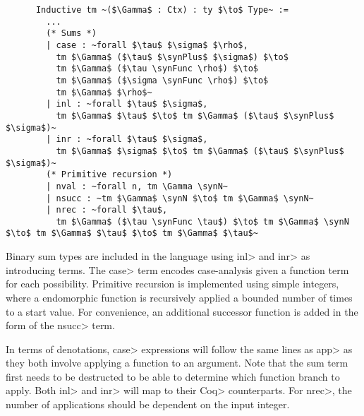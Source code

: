  \begin{listing}
    \begin{verbatim}
      Inductive tm ~($\Gamma$ : Ctx) : ty $\to$ Type~ :=
        ...
        (* Sums *)
        | case : ~forall $\tau$ $\sigma$ $\rho$,
          tm $\Gamma$ ($\tau$ $\synPlus$ $\sigma$) $\to$
          tm $\Gamma$ ($\tau \synFunc \rho$) $\to$
          tm $\Gamma$ ($\sigma \synFunc \rho$) $\to$
          tm $\Gamma$ $\rho$~
        | inl : ~forall $\tau$ $\sigma$,
          tm $\Gamma$ $\tau$ $\to$ tm $\Gamma$ ($\tau$ $\synPlus$ $\sigma$)~
        | inr : ~forall $\tau$ $\sigma$,
          tm $\Gamma$ $\sigma$ $\to$ tm $\Gamma$ ($\tau$ $\synPlus$ $\sigma$)~
        (* Primitive recursion *)
        | nval : ~forall n, tm \Gamma \synN~
        | nsucc : ~tm $\Gamma$ \synN $\to$ tm $\Gamma$ \synN~
        | nrec : ~forall $\tau$,
          tm $\Gamma$ ($\tau \synFunc \tau$) $\to$ tm $\Gamma$ \synN $\to$ tm $\Gamma$ $\tau$ $\to$ tm $\Gamma$ $\tau$~
    \end{verbatim}
    \caption{Terms in our language related to sum types.}
    \label{lst:stlc_sums}
  \end{listing}

  Binary sum types are included in the language using \<inl> and \<inr> as introducing terms.
  The \<case> term encodes case-analysis given a function term for each possibility.
  Primitive recursion is implemented using simple integers, where a endomorphic function is recursively applied a bounded number of times to a start value.
  For convenience, an additional successor function is added in the form of the \<nsucc> term.

  In terms of denotations, \<case> expressions will follow the same lines as \<app> as they both involve applying a function to an argument.
  Note that the sum term first needs to be destructed to be able to determine which function branch to apply.
  Both \<inl> and \<inr> will map to their \<Coq> counterparts.
  For \<nrec>, the number of applications should be dependent on the input integer.


